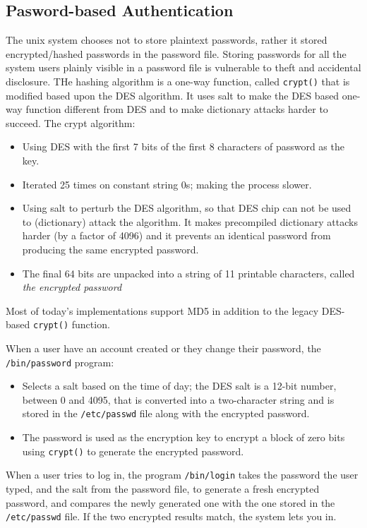 \documentclass{article}
\begin{document}
\subsection{Pasword-based Authentication}
The unix system chooses not to store plaintext passwords, rather it stored encrypted/hashed passwords in the password file. Storing passwords for all the system users plainly visible in a password file is vulnerable to theft and accidental disclosure. THe hashing algorithm is a one-way function, called \texttt{crypt()} that is modified based upon the DES algorithm. It uses salt to make the DES based one-way function different from DES and to make dictionary attacks harder to succeed. The crypt algorithm:
\begin{itemize}
  \item Using DES with the first 7 bits of the first 8 characters of password as the key.
  \item Iterated 25 times on constant string 0s; making the process slower.
  \item Using salt to perturb the DES algorithm, so that DES chip can not be used to (dictionary) attack the algorithm. It makes precompiled dictionary attacks harder (by a factor of 4096) and it prevents an identical password from producing the same encrypted password.
  \item The final 64 bits are unpacked into a string of 11 printable characters, called \textit{the encrypted password}
\end{itemize}
Most of today's implementations support MD5 in addition to the legacy DES-based \texttt{crypt()} function.

When a user have an account created or they change their password, the \texttt{/bin/password} program:
\begin{itemize}
  \item Selects a salt based on the time of day; the DES salt is a 12-bit number, between 0 and 4095, that is converted into a two-character string and is stored in the \texttt{/etc/passwd} file along with the encrypted password.
  \item The password is used as the encryption key to encrypt a block of zero bits using \texttt{crypt()} to generate the encrypted password.
\end{itemize}
When a user tries to log in, the program \texttt{/bin/login} takes the password the user typed, and the salt from the password file, to generate a fresh encrypted password, and compares the newly generated one with the one stored in the \texttt{/etc/passwd} file. If the two encrypted results match, the system lets you in.
\end{document}
